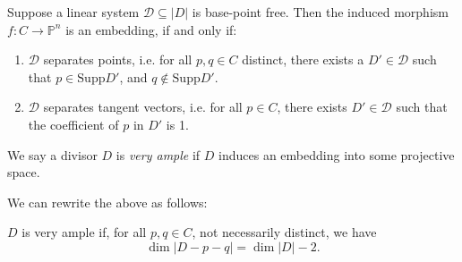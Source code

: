 \documentclass[12pt]{article}
\begin{document}
\begin{theorem}
	Suppose a linear system $\mathcal{D} \subseteq |D|$ is base-point free. Then the induced morphism $f : C \to \mathbb{P}^n$ is an embedding, if and only if:
	\begin{enumerate}[\normalfont(i)]
		\item $\mathcal{D}$ separates points, i.e. for all $p, q \in C$ distinct, there exists a $D' \in \mathcal{D}$ such that $p \in \mathrm{Supp}D'$, and $q \not \in \mathrm{Supp}D'$.
		\item $\mathcal{D}$ separates tangent vectors, i.e. for all $p \in C$, there exists $D' \in \mathcal{D}$ such that the coefficient of $p$ in $D'$ is 1.
	\end{enumerate}
\end{theorem}

\begin{definition}
	We say a divisor $D$ is \emph{very ample} if $D$ induces an embedding into some projective space.
\end{definition}

We can rewrite the above as follows:

\begin{theorem}
	$D$ is very ample if, for all $p, q \in C$, not necessarily distinct, we have
	\[
	\dim |D - p - q| = \dim |D| - 2.
	\]
\end{theorem}
\end{document}
